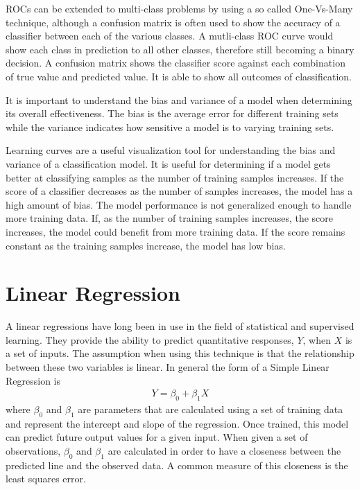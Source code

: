 ROCs can be extended to multi-class problems by using a so called One-Vs-Many technique, although a confusion matrix is often used to show the accuracy of a classifier between each of the various classes.  A mutli-class ROC curve would show each class in prediction to all other classes, therefore still becoming a binary decision.  A confusion matrix shows the classifier score against each combination of true value and predicted value.  It is able to show all outcomes of classification.

It is important to understand the bias and variance of a model when determining its overall effectiveness.  The bias is the average error for different training sets while the variance indicates how sensitive a model is to varying training sets.

Learning curves are a useful visualization tool for understanding the bias and variance of a classification model.  It is useful for determining if a model gets better at classifying samples as the number of training samples increases.  If the score of a classifier decreases as the number of samples increases, the model has a high amount of bias.  The model performance is not generalized enough to handle more training data.  If, as the number of training samples increases, the score increases, the model could benefit from more training data.  If the score remains constant as the training samples increase, the model has low bias.
%
\section{Linear Regression}
%
%
A linear regressions have long been in use in the field of statistical and supervised learning.  They provide the ability to predict quantitative responses, $Y$, when $X$ is a set of inputs.  The assumption when using this technique is that the relationship between these two variables is linear.  In general the form of a Simple Linear Regression is
%
\begin{align}
    Y = \beta_0 + \beta_1 X
\end{align}
%
where $\beta_0$ and $\beta_1$ are parameters that are calculated using a set of training data and represent the intercept and slope of the regression.  Once trained, this model can predict future output values for a given input.  When given a set of observations, $\beta_0$ and $\beta_1$ are calculated in order to have a closeness between the predicted line and the observed data.  A common measure of this closeness is the least squares error.

